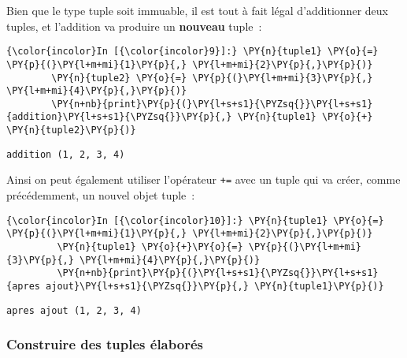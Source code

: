     Bien que le type tuple soit immuable, il est tout à fait légal
d'additionner deux tuples, et l'addition va produire un \textbf{nouveau}
tuple~:

    \begin{Verbatim}[commandchars=\\\{\},frame=single,framerule=0.3mm,rulecolor=\color{cellframecolor}]
{\color{incolor}In [{\color{incolor}9}]:} \PY{n}{tuple1} \PY{o}{=} \PY{p}{(}\PY{l+m+mi}{1}\PY{p}{,} \PY{l+m+mi}{2}\PY{p}{,}\PY{p}{)}
        \PY{n}{tuple2} \PY{o}{=} \PY{p}{(}\PY{l+m+mi}{3}\PY{p}{,} \PY{l+m+mi}{4}\PY{p}{,}\PY{p}{)}
        \PY{n+nb}{print}\PY{p}{(}\PY{l+s+s1}{\PYZsq{}}\PY{l+s+s1}{addition}\PY{l+s+s1}{\PYZsq{}}\PY{p}{,} \PY{n}{tuple1} \PY{o}{+} \PY{n}{tuple2}\PY{p}{)}
\end{Verbatim}


    \begin{Verbatim}[commandchars=\\\{\},frame=single,framerule=0.3mm,rulecolor=\color{cellframecolor}]
addition (1, 2, 3, 4)
\end{Verbatim}

    Ainsi on peut également utiliser l'opérateur \texttt{+=} avec un tuple
qui va créer, comme précédemment, un nouvel objet tuple~:

    \begin{Verbatim}[commandchars=\\\{\},frame=single,framerule=0.3mm,rulecolor=\color{cellframecolor}]
{\color{incolor}In [{\color{incolor}10}]:} \PY{n}{tuple1} \PY{o}{=} \PY{p}{(}\PY{l+m+mi}{1}\PY{p}{,} \PY{l+m+mi}{2}\PY{p}{,}\PY{p}{)}
         \PY{n}{tuple1} \PY{o}{+}\PY{o}{=} \PY{p}{(}\PY{l+m+mi}{3}\PY{p}{,} \PY{l+m+mi}{4}\PY{p}{,}\PY{p}{)}
         \PY{n+nb}{print}\PY{p}{(}\PY{l+s+s1}{\PYZsq{}}\PY{l+s+s1}{apres ajout}\PY{l+s+s1}{\PYZsq{}}\PY{p}{,} \PY{n}{tuple1}\PY{p}{)}
\end{Verbatim}


    \begin{Verbatim}[commandchars=\\\{\},frame=single,framerule=0.3mm,rulecolor=\color{cellframecolor}]
apres ajout (1, 2, 3, 4)
\end{Verbatim}

    \hypertarget{construire-des-tuples-uxe9laboruxe9s}{%
\subsubsection{Construire des tuples
élaborés}\label{construire-des-tuples-uxe9laboruxe9s}}

